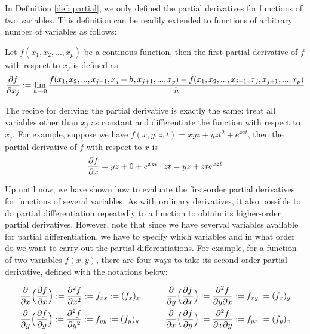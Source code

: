 In Definition \ref{def: partial}, we only defined the partial derivatives for functions of two variables.  This definition can be readily extended to functions of arbitrary number of variables as follows:

\begin{defi}{}
    Let $f(x_1, x_2, ..., x_p)$ be a continous function, then the first partial derivative of $f$ with respect to $x_j$ is defined as
    \[\frac{\partial f}{\partial x_j} := \lim_{h \rightarrow 0} \frac{f(x_1, x_2, ..., x_{j-1}, x_j+h, x_{j+1}, ... ,x_p)-f(x_1, x_2, ..., x_{j-1}, x_j, x_{j+1}, ... ,x_p)}{h}\]
\end{defi}

The recipe for deriving the partial derivative is exactly the same: treat all variables other than $x_j$ as constant and differentiate the function with respect to $x_j$.  For example, suppose we have $f(x,y,z,t) = xyz + yzt^2 + e^{xzt}$, then the partial derivative of $f$ with respect to $x$ is 
\[\frac{\partial f}{\partial x} = yz + 0 + e^{xzt} \cdot zt = yz + zte^{xzt}\]

Up until now, we have shown how to evaluate the first-order partial derivatives for functions of several variables.  As with ordinary derivatives, it also possible to do partial differentiation repeatedly to a function to obtain its higher-order partial derivatives.  However, note that since we have severval variables available for partial differentiation, we have to specify which variables and in what order do we want to carry out the partial differentiations.  For example, for a function of two variables $f(x,y)$, there are four ways to take its second-order partial derivative, defined with the notations below:

\begin{align*}
    &\frac{\partial}{\partial x}\Big(\frac{\partial f}{\partial x}\Big) := \frac{\partial^2 f}{\partial x^2} := f_{xx} := (f_x)_x \qquad 
    &\frac{\partial}{\partial y}\Big(\frac{\partial f}{\partial x}\Big) := \frac{\partial^2 f}{\partial y \partial x} := f_{xy} := (f_x)_y\\
    &\frac{\partial}{\partial y}\Big(\frac{\partial f}{\partial y}\Big) := \frac{\partial^2 f}{\partial y^2} := f_{yy} := (f_y)_y \qquad &\frac{\partial}{\partial x}\Big(\frac{\partial f}{\partial y}\Big) := \frac{\partial^2 f}{\partial x \partial y} := f_{yx} := (f_y)_x
    \\
\end{align*}

